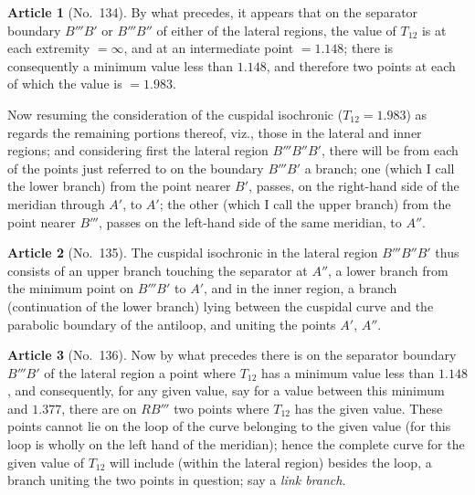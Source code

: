 \documentclass[11pt,a4paper]{article}
\theoremstyle{definition}
\newtheorem{art}{Article}
\begin{document}
\begin{art}[No.~134]
By what precedes, it appears that on the separator boundary $B'''B'$ or $B'''B''$ of either of the lateral regions, the value of $T_{12}$ is at each extremity $= \infty$, and at an intermediate point $= 1.148$; there is consequently a minimum value less than $1.148$, and therefore two points at each of which the value is $= 1.983$.

Now resuming the consideration of the cuspidal isochronic ($T_{12} = 1.983$) as regards the remaining portions thereof, viz., those in the lateral and inner regions; and considering first the lateral region $B'''B''B'$, there will be from each of the points just referred to on the boundary $B'''B'$ a branch; one (which I call the lower branch) from the point nearer $B'$, passes, on the right-hand side of the meridian through $A'$, to $A'$; the other (which I call the upper branch) from the point nearer $B'''$, passes on the left-hand side of the same meridian, to $A''$.
\end{art}

\begin{art}[No.~135]
The cuspidal isochronic in the lateral region $B'''B''B'$ thus consists of an upper branch touching the separator at $A''$, a lower branch from the minimum point on $B'''B'$ to $A'$, and in the inner region, a branch (continuation of the lower branch) lying between the cuspidal curve and the parabolic boundary of the antiloop, and uniting the points $A'$, $A''$.
\end{art}

\begin{art}[No.~136]
Now by what precedes there is on the separator boundary $B'''B'$ of the lateral region a point where $T_{12}$ has a minimum value less than $1.148$, and consequently, for any given value, say for a value between this minimum and $1.377$, there are on $RB'''$ two points where $T_{12}$ has the given value. These points cannot lie on the loop of the curve belonging to the given value (for this loop is wholly on the left hand of the meridian); hence the complete curve for the given value of $T_{12}$ will include (within the lateral region) besides the loop, a branch uniting the two points in question; say a \emph{link branch}.
\end{art}
\end{document}
